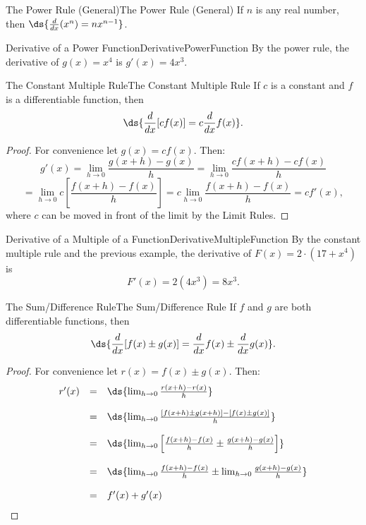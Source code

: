 \begin{theorem}{The Power Rule (General)}{The Power Rule (General)}
If $n$ is any real number, then $\ds{\frac{d}{dx}(x^n)=nx^{n-1}}$.
\end{theorem}

\begin{example}{Derivative of a Power Function}{DerivativePowerFunction}
By the power rule, the derivative of $g(x)=x^4$ is $g'(x)=4x^3$.
\end{example}

\begin{theorem}{The Constant Multiple Rule}{The Constant Multiple Rule}
If $c$ is a constant and $f$ is a differentiable function, then $$\ds{\frac{d}{dx}[cf(x)]=c\frac{d}{dx}f(x)}.$$
\end{theorem}

\begin{proof}
For convenience let $g(x)=cf(x)$.
Then:
$$g'(x)=\lim_{h\to 0}\frac{g(x+h)-g(x)}{h}=\lim_{h\to 0}\frac{cf(x+h)-cf(x)}{h}$$
$$=\lim_{h\to 0}c\left[\frac{f(x+h)-f(x)}{h}\right]=c\lim_{h\to 0}\frac{f(x+h)-f(x)}{h}=cf'(x),$$
where $c$ can be moved in front of the limit by the Limit Rules.
\end{proof}

\begin{example}{Derivative of a Multiple of a  Function}{DerivativeMultipleFunction}
By the constant multiple rule and the previous example, the derivative of $F(x)=2\cdot(17+x^4)$ is
$$F'(x)=2(4x^3)=8x^3.$$
\end{example}

\begin{theorem}{The Sum/Difference Rule}{The Sum/Difference Rule}
If $f$ and $g$ are both differentiable functions, then
$$\ds{\frac{d}{dx}[f(x)\pm g(x)]=\frac{d}{dx}f(x)\pm\frac{d}{dx}g(x)}.$$
\end{theorem}

\begin{proof}
For convenience let $r(x)=f(x)\pm g(x)$.
Then:
$$\begin{array}{ccl}
r'(x)&=&\ds{\lim_{h\to 0}\frac{r(x+h)-r(x)}{h}}\\
\\
&=&\ds{\lim_{h\to 0}\frac{[f(x+h)\pm g(x+h)]-[f(x)\pm g(x)]}{h}}\\
\\
~&=&\ds{\lim_{h\to 0}\left[\frac{f(x+h)-f(x)}{h}\pm\frac{g(x+h)-g(x)}{h}\right]}\\
\\
&=&\ds{\lim_{h\to 0}\frac{f(x+h)-f(x)}{h}\pm\lim_{h\to 0}\frac{g(x+h)-g(x)}{h}}\\
\\
~&=&f'(x)+g'(x)\\\end{array}$$
\end{proof}

